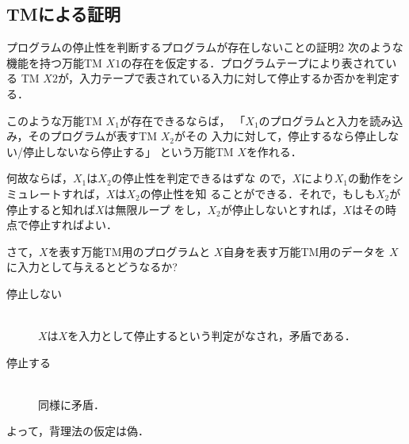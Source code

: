 \subsection{TMによる証明}
\begin{myproof}{プログラムの停止性を判断するプログラムが存在しないことの証明2}
次のような機能を持つ万能TM $X1$の存在を仮定する．プログラムテープにより表されている
TM $X2$が，入力テープで表されている入力に対して停止するか否かを判定する．

このような万能TM $X_1$が存在できるならば，
 「$X_1$のプログラムと入力を読み込み，そのプログラムが表すTM $X_2$がその
 入力に対して，停止するなら停止しない/停止しないなら停止する」
という万能TM $X$を作れる．

 何故ならば，$X_1$は$X_2$の停止性を判定できるはずな
 ので，$X$により$X_1$の動作をシミュレートすれば，$X$は$X_2$の停止性を知
 ることができる．それで，もしも$X_2$が停止すると知れば$X$は無限ループ
 をし，$X_2$が停止しないとすれば，$X$はその時点で停止すればよい．

さて，$X$を表す万能TM用のプログラムと
$X$自身を表す万能TM用のデータを
$X$に入力として与えるとどうなるか?

\begin{description}
 \item[停止しない] \mbox{} \\
            $X$は$X$を入力として停止するという判定がなされ，矛盾である．
 \item[停止する] \mbox{} \\
            同様に矛盾．
\end{description}
よって，背理法の仮定は偽．
\end{myproof}



